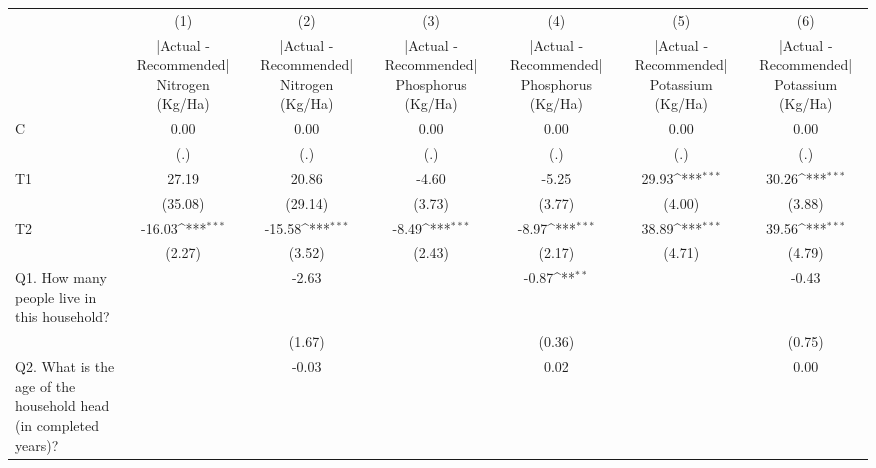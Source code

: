{
\def\sym#1{\ifmmode^{#1}\else\(^{#1}\)\fi}
\begin{tabular}{l*{6}{c}}
\hline\hline
                    &\multicolumn{1}{c}{(1)}&\multicolumn{1}{c}{(2)}&\multicolumn{1}{c}{(3)}&\multicolumn{1}{c}{(4)}&\multicolumn{1}{c}{(5)}&\multicolumn{1}{c}{(6)}\\
                    &\multicolumn{1}{c}{|Actual - Recommended| Nitrogen (Kg/Ha)}&\multicolumn{1}{c}{|Actual - Recommended| Nitrogen (Kg/Ha)}&\multicolumn{1}{c}{|Actual - Recommended| Phosphorus (Kg/Ha)}&\multicolumn{1}{c}{|Actual - Recommended| Phosphorus (Kg/Ha)}&\multicolumn{1}{c}{|Actual - Recommended| Potassium (Kg/Ha)}&\multicolumn{1}{c}{|Actual - Recommended| Potassium (Kg/Ha)}\\
\hline
C                   &        0.00         &        0.00         &        0.00         &        0.00         &        0.00         &        0.00         \\
                    &         (.)         &         (.)         &         (.)         &         (.)         &         (.)         &         (.)         \\
[1em]
T1                  &       27.19         &       20.86         &       -4.60         &       -5.25         &       29.93\sym{***}&       30.26\sym{***}\\
                    &     (35.08)         &     (29.14)         &      (3.73)         &      (3.77)         &      (4.00)         &      (3.88)         \\
[1em]
T2                  &      -16.03\sym{***}&      -15.58\sym{***}&       -8.49\sym{***}&       -8.97\sym{***}&       38.89\sym{***}&       39.56\sym{***}\\
                    &      (2.27)         &      (3.52)         &      (2.43)         &      (2.17)         &      (4.71)         &      (4.79)         \\
[1em]
Q1. How many people live in this household?&                     &       -2.63         &                     &       -0.87\sym{**} &                     &       -0.43         \\
                    &                     &      (1.67)         &                     &      (0.36)         &                     &      (0.75)         \\
[1em]
Q2. What is the age of the household head (in completed years)?&                     &       -0.03         &                     &        0.02         &                     &        0.00         \\

\end{tabular}}
